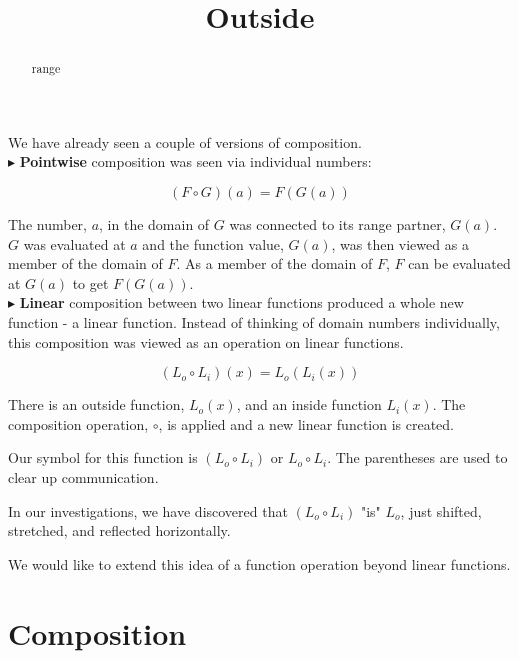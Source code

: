 \documentclass{ximera}
\title{Outside}
\begin{document}
\begin{abstract}
range
\end{abstract}
\maketitle





We have already seen a couple of versions of composition. \\

$\blacktriangleright$ \textbf{Pointwise} composition was seen via individual numbers: 

\[ (F \circ G)(a) = F(G(a)) \]

The number, $a$, in the domain of $G$ was connected to its range partner, $G(a)$.  $G$ was evaluated at $a$ and the function value, $G(a)$, was then viewed as a member of the domain of $F$.  As a member of the domain of $F$, $F$ can be evaluated at $G(a)$ to get $F(G(a))$. \\




$\blacktriangleright$ \textbf{Linear} composition between two linear functions produced a whole new function - a linear function.  Instead of thinking of domain numbers individually, this composition was viewed as an operation on linear functions.

\[    (L_o \circ L_i)(x) = L_o(L_i(x))  \]

There is an outside function, $L_o(x)$, and an inside function $L_i(x)$.  The composition operation, $\circ$, is applied and a new linear function is created.  



Our symbol for this function is $(L_o \circ L_i)$ or $L_o \circ L_i$.  The parentheses are used to clear up communication.

In our investigations, we have discovered that $(L_o \circ L_i)$ "is" $L_o$, just shifted, stretched, and reflected horizontally.


We would like to extend this idea of a function operation beyond linear functions.





\section{Composition}
\end{document}
